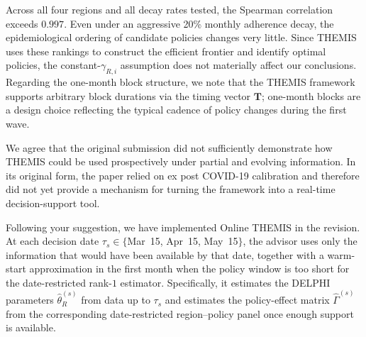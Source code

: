 \documentclass[letterpaper,twoside,11pt]{reviewresponse}
\begin{document}
Across all four regions and all decay rates tested, the Spearman correlation exceeds $0.997$. Even under an aggressive 20\% monthly adherence decay, the epidemiological ordering of candidate policies changes very little. Since THEMIS uses these rankings to construct the efficient frontier and identify optimal policies, the constant-$\gamma_{R,i}$ assumption does not materially affect our conclusions. Regarding the one-month block structure, we note that the THEMIS framework supports arbitrary block durations via the timing vector $\bm{T}$; one-month blocks are a design choice reflecting the typical cadence of policy changes during the first wave.


We agree that the original submission did not sufficiently demonstrate how THEMIS could be used prospectively under partial and evolving information. In its original form, the paper relied on ex post COVID-19 calibration and therefore did not yet provide a mechanism for turning the framework into a real-time decision-support tool.

Following your suggestion, we have implemented Online THEMIS in the revision. At each decision date $\tau_s\in\{$Mar~15, Apr~15, May~15$\}$, the advisor uses only the information that would have been available by that date, together with a warm-start approximation in the first month when the policy window is too short for the date-restricted rank-$1$ estimator. Specifically, it estimates the DELPHI parameters $\hat{\theta}_R^{(s)}$ from data up to $\tau_s$ and estimates the policy-effect matrix $\hat{\Gamma}^{(s)}$ from the corresponding date-restricted region--policy panel once enough support is available.
\end{document}

